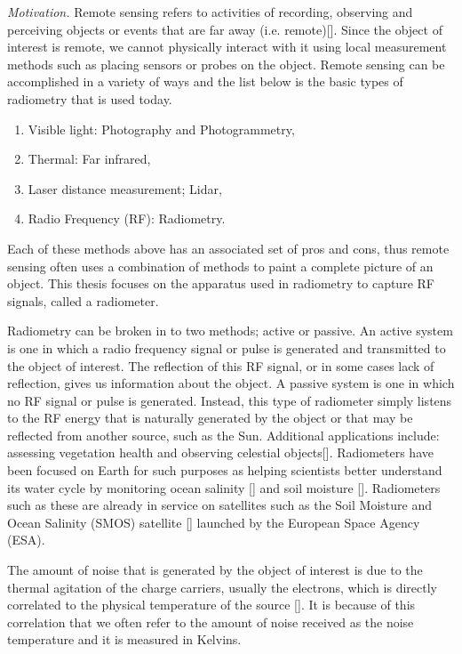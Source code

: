\emph{Motivation.}  Remote sensing refers to activities of recording, observing and perceiving objects or events that are far away (i.e. remote)[\cite{weng2012}].  Since the object of interest is remote, we cannot physically interact with it using local measurement methods such as placing sensors or probes on the object.  Remote sensing can be accomplished in a variety of ways and the list below is the basic types of radiometry that is used today.

\begin{enumerate}
\item Visible light: Photography and Photogrammetry,
\item Thermal: Far infrared,
\item Laser distance measurement; Lidar,
\item Radio Frequency (RF): Radiometry.
\end{enumerate}

Each of these methods above has an associated set of pros and cons, thus remote sensing often uses a combination of methods to paint a complete picture of an object.  This thesis focuses on the apparatus used in radiometry to capture RF signals, called a radiometer.

Radiometry can be broken in to two methods; active or passive.  An active system is one in which a radio frequency signal or pulse is generated and transmitted to the object of interest.  The reflection of this RF signal, or in some cases lack of reflection, gives us information about the object.  A passive system is one in which no RF signal or pulse is generated.  Instead, this type of radiometer simply listens to the RF energy that is naturally generated by the object or that may be reflected from another source, such as the Sun.  Additional applications include: assessing vegetation health and observing celestial objects[\cite{ulaby2014}].  Radiometers have been focused on Earth for such purposes as helping scientists better understand its water cycle by monitoring ocean salinity [\cite{Hardy}] and soil moisture [\cite{Liu}].  Radiometers such as these are already in service on satellites such as the Soil Moisture and Ocean Salinity (SMOS) satellite [\cite{McMullan}] launched by the European Space Agency (ESA).

The amount of noise that is generated by the object of interest is due to the thermal agitation of the charge carriers, usually the electrons, which is directly correlated to the physical temperature of the source [\cite{Nyquist1928thermal}].  It is because of this correlation that we often refer to the amount of noise received as the noise temperature and it is measured in Kelvins.

